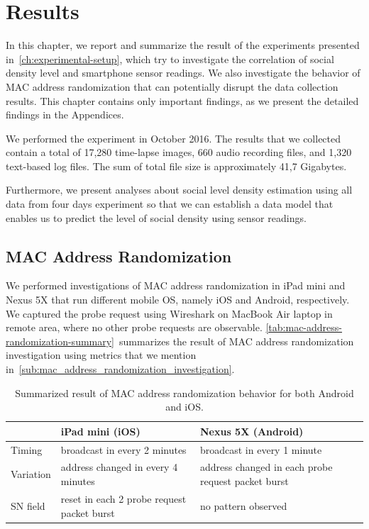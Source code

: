 \chapter{Results}
\label{ch:results} %
In this chapter, we report and summarize the result of the experiments presented in~\autoref{ch:experimental-setup}, which try to investigate the correlation of social density level and smartphone sensor readings. We also investigate the behavior of \ac{MAC} address randomization that can potentially disrupt the data collection results. This chapter contains only important findings, as we present the detailed findings in the Appendices.

We performed the experiment in October 2016. The results that we collected contain a total of 17,280 time-lapse images, 660 audio recording files, and 1,320 text-based log files. The sum of total file size is approximately 41,7 Gigabytes.

Furthermore, we present analyses about social level density estimation using all data from four days experiment so that we can establish a data model that enables us to predict the level of social density using sensor readings.

\section{MAC Address Randomization} %
\label{sec:mac-address-randomization}
We performed investigations of \ac{MAC} address randomization in iPad mini and Nexus 5X that run different mobile \ac{OS}, namely iOS and Android, respectively. We captured the probe request using Wireshark on MacBook Air laptop in remote area, where no other probe requests are observable. \autoref{tab:mac-address-randomization-summary}~summarizes the result of \ac{MAC} address randomization investigation using metrics that we mention in~\autoref{sub:mac_address_randomization_investigation}.

\begin{table}[ht]
\centering
\caption{Summarized result of \ac{MAC} address randomization behavior for both Android and iOS.}
\label{tab:mac-address-randomization-summary}
\begin{tabularx}{\textwidth}{lXX}
\toprule
                                        & iPad mini (iOS) & Nexus 5X (Android) \\
                                        \midrule
Timing    & broadcast in every 2 minutes & broadcast in every 1 minute \\ 
Variation & address changed in every 4 minutes & address changed in each probe request packet burst \\
\ac{SN} field & reset in each 2 probe request packet burst & no pattern observed \\ \bottomrule
\end{tabularx}
\end{table}

